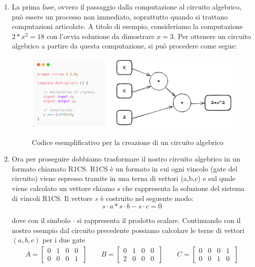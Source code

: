 \begin{enumerate}
    \item  La prima fase, ovvero il passaggio dalla computazione al circuito algebrico, può essere un processo non immediato,
    soprattutto quando si trattano computazioni articolate. A titolo di esempio, consideriamo la computazione $2*x^2=18$ con
    l'ovvia soluzione da dimostrare $x=3$. Per ottenere un circuito algebrico a partire da questa computazione, si può
    procedere come segue:\clearpage
        
    \begin{figure}[H]
        \centering
        \includegraphics[width=14cm]{./chapters/1.state-of-art/images/9.comp_circ.png}
        \label{fig:comp-circ}
        \captionsetup{justification=centering}
        \caption{Codice esemplificativo per la creazione di un circuito algebrico}
    \end{figure}

    \item  Ora per proseguire dobbiamo trasformare il nostro circuito algebrico in un formato chiamato R1CS. R1CS è un
    formato in cui ogni vincolo (gate del circuito) viene espresso tramite in una terna di vettori (a,b,c) e sul quale viene
    calcolato un vettore chiamo $s$ che rappresenta la soluzione del sistema di vincoli R1CS. Il vettore $s$ è
    costruito nel seguente modo:
    $$
    s \cdot a * s \cdot  b - s \cdot  c = 0
    $$
    
    dove con il simbolo $\cdot$  si rappresenta il prodotto scalare. Continuando con il nostro esempio dal circuito
    precedente possiamo calcolare le terne di vettori $(a,b,c)$ per i due gate
    \begin{gather*}
        A =
        \begin{bmatrix}
        0 & 1 & 0 & 0 \\
        0 & 0 & 0 & 1 \
        \end{bmatrix}
        \qquad
        B =
        \begin{bmatrix}
        0 & 1 & 0 & 0 \\
        2 & 0 & 0 & 0 \
        \end{bmatrix}
        \qquad
        C =
        \begin{bmatrix}
        0 & 0 & 0 & 1 \\
        0 & 0 & 1 & 0 \
        \end{bmatrix}
    \end{gather*}
        

\end{enumerate}
